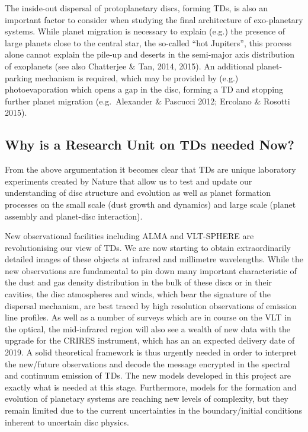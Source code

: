 \documentclass[10pt,fleqn,twoside]{article}
\begin{document}
 The inside-out dispersal of
protoplanetary discs, forming TDs, is also an important
factor to consider when studying the final architecture of
exo-planetary systems. While planet migration is necessary to explain
(e.g.) the presence of large planets close to the central star, the
so-called ``hot Jupiters'', this process alone cannot explain the pile-up and
deserts in the semi-major axis distribution of exoplanets (see also
Chatterjee \& Tan, 2014, 2015). An
additional planet-parking mechanism is required, which may be provided by (e.g.)
photoevaporation which opens a gap in the disc, forming a TD and
stopping further planet migration (e.g.\ Alexander \& Pascucci 2012; Ercolano \& Rosotti
2015).

\subsection{Why is a Research Unit on TDs needed Now?}
%
 From the above argumentation it becomes clear that TDs are
  unique laboratory experiments created by Nature that allow us to test and
  update our understanding of disc structure and evolution as well as planet
  formation processes on the small scale (dust growth and dynamics) and
  large scale (planet assembly and planet-disc interaction). 

New observational facilities including ALMA and VLT-SPHERE are revolutionising our view of
TDs. We are now starting to obtain extraordinarily detailed images of these objects at infrared and
millimetre wavelengths. While the new observations are fundamental to pin down many important
characteristic of the dust and gas density distribution in the bulk of
these discs or in their cavities, the disc atmospheres and winds, which bear the signature of the dispersal mechanism, are
best traced by high resolution observations of emission line profiles. As well as a number of surveys
which are in course on the VLT in the optical, the mid-infrared region will also see a wealth of new
data with the upgrade for the CRIRES instrument, which has an an expected delivery date of 2019.
A solid theoretical framework is thus urgently needed in order to interpret the new/future
observations and decode the message encrypted in the spectral and continuum emission of
TDs. The new models developed in this project are exactly what is needed at this stage.
Furthermore, models for the formation and evolution of planetary systems are reaching new
levels of complexity, but they remain limited due to the current uncertainties in the boundary/initial
conditions inherent to uncertain disc physics.
\end{document}
